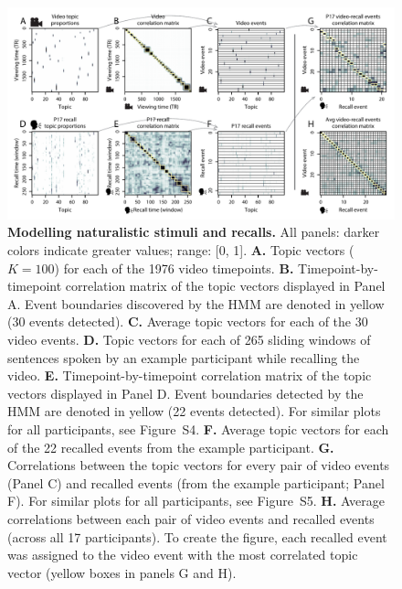 \documentclass{article}
\newcommand{\corrmats}{S4}
\newcommand{\matchmats}{S5}
\begin{document}
\begin{figure}[tp]
\centering
\includegraphics[width=\textwidth]{figs/eventseg}
\caption{\small \textbf{Modelling naturalistic stimuli and recalls.} All panels: darker colors indicate greater values; range: [0, 1].  \textbf{A.} Topic vectors ($K = 100$) for each of the 1976 video timepoints.  \textbf{B.} Timepoint-by-timepoint correlation matrix of the topic vectors displayed in Panel A.  Event boundaries discovered by the HMM are denoted in yellow (30 events detected).  \textbf{C.} Average topic vectors for each of the 30 video events. \textbf{D.} Topic vectors for each of 265 sliding windows of sentences spoken by an example participant while recalling the video.  \textbf{E.} Timepoint-by-timepoint correlation matrix of the topic vectors displayed in Panel D. Event boundaries detected by the HMM are denoted in yellow (22 events detected).  For similar plots for all participants, see Figure~\corrmats.  \textbf{F.} Average topic vectors for each of the 22 recalled events from the example participant.  \textbf{G.} Correlations between the topic vectors for every pair of video events (Panel C) and recalled events (from the example participant; Panel F).  For similar plots for all participants, see Figure~\matchmats.  \textbf{H.} Average correlations between each pair of video events and recalled events (across all 17 participants).  To create the figure, each recalled event was assigned to the video event with the most correlated topic vector (yellow boxes in panels G and H).}
\label{fig:model}
\end{figure}
\end{document}
